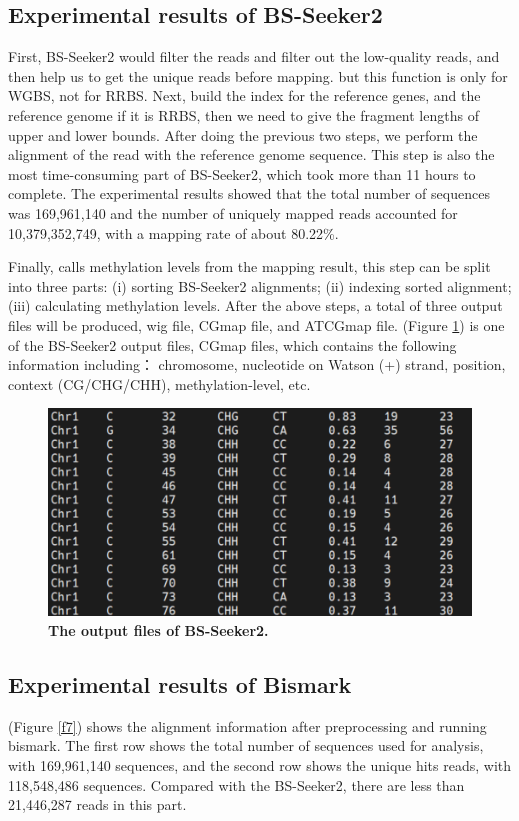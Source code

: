 \documentclass{PHlab-thesis}
\begin{document}
\subsection{Experimental results of BS-Seeker2}
First, BS-Seeker2 would filter the reads and filter out the low-quality reads, and then help us to get the unique reads before mapping. but this function is only for WGBS, not for RRBS. Next, build the index for the reference genes, and the reference genome if it is RRBS, then we need to give the fragment lengths of upper and lower bounds. After doing the previous two steps, we perform the alignment of the read with the reference genome sequence. This step is also the most time-consuming part of BS-Seeker2, which took more than 11 hours to complete. The experimental results showed that the total number of sequences was 169,961,140 and the number of uniquely mapped reads accounted for 10,379,352,749, with a mapping rate of about 80.22\%.

\par
Finally, calls methylation levels from the mapping result, this step can be split into three parts: (i) sorting BS-Seeker2 alignments; (ii) indexing sorted alignment; (iii) calculating methylation levels. After the above steps, a total of three output files will be produced, wig file, CGmap file, and ATCGmap file. (Figure \ref{f6}) is one of the BS-Seeker2 output files, CGmap files, which contains the following information including： chromosome, nucleotide on Watson (+) strand, position, context (CG/CHG/CHH), methylation-level, etc.

\begin{figure}[h]
  \centering
  \includegraphics[scale=1.0]{table/CGmap.png}
  \caption{\textbf{The output files of BS-Seeker2.}
  }
  \label{f6}
\end{figure}


\subsection{Experimental results of Bismark}
(Figure \ref{f7}) shows the alignment information after preprocessing and running bismark. The first row shows the total number of sequences used for analysis, with 169,961,140 sequences, and the second row shows the unique hits reads, with 118,548,486 sequences. Compared with the BS-Seeker2, there are less than 21,446,287 reads in this part.
\end{document}
